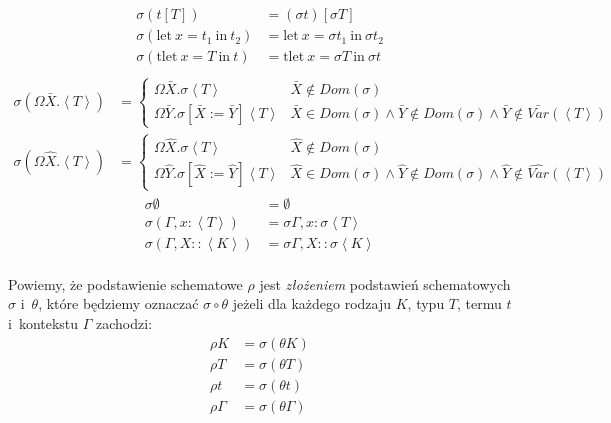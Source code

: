 \documentclass[11pt,leqno]{article}
\begin{document}
\begin{definicja}
\begin{align*}
\sigma (t[T]) & = (\sigma t)[\sigma T] \\
\sigma (\textrm{let} \ x = t_1 \ \textrm{in} \ t_2) & = \textrm{let} \ x = \sigma t_1 \ \textrm{in} \ \sigma t_2 \\
\sigma (\textrm{tlet} \ x = T \ \textrm{in} \ t) & = \textrm{tlet} \ x = \sigma T \ \textrm{in} \ \sigma t \\
\end{align*}
\begin{align*}
\sigma (\Omega\bar{X}.\left<T\right>) & =
	\begin{cases}
		\Omega\bar{X}.\sigma\left<T\right> & \bar{X} \notin Dom(\sigma) \\
		\Omega\bar{Y}.\sigma[\bar{X}:=\bar{Y}]\left<T\right> & \bar{X} \in Dom(\sigma) \land \bar{Y} \notin Dom(\sigma) \land \bar{Y} \notin \bar{Var}(\left<T\right>)
	\end{cases} \\
\sigma (\Omega\widehat{X}.\left<T\right>) & =
	\begin{cases}
		\Omega\widehat{X}.\sigma\left<T\right> & \widehat{X} \notin Dom(\sigma) \\
		\Omega\widehat{Y}.\sigma[\widehat{X}:=\widehat{Y}]\left<T\right> & \widehat{X} \in Dom(\sigma) \land \widehat{Y} \notin Dom(\sigma) \land \widehat{Y} \notin \widehat{Var}(\left<T\right>)
	\end{cases}
\end{align*}
\begin{align*}
\sigma \emptyset & = \emptyset \\
\sigma (\Gamma, x : \left<T\right>) & = \sigma \Gamma, x : \sigma \left<T\right> \\
\sigma (\Gamma, X :: \left<K\right>) & = \sigma \Gamma, X :: \sigma \left<K\right> \\
\end{align*}
\end{definicja}

\begin{definicja}
Powiemy, że podstawienie schematowe $\rho$ jest \emph{złożeniem} podstawień schematowych $\sigma$ i~$\theta$, 
które będziemy oznaczać $\sigma\circ\theta$ jeżeli
dla każdego rodzaju $K$, typu $T$, termu $t$ i~kontekstu $\Gamma$ zachodzi:
\begin{align*}
\rho K & = \sigma(\theta K) \\
\rho T & = \sigma(\theta T) \\
\rho t & = \sigma(\theta t) \\
\rho \Gamma & = \sigma(\theta \Gamma)
\end{align*}
\end{definicja}
\end{document}
